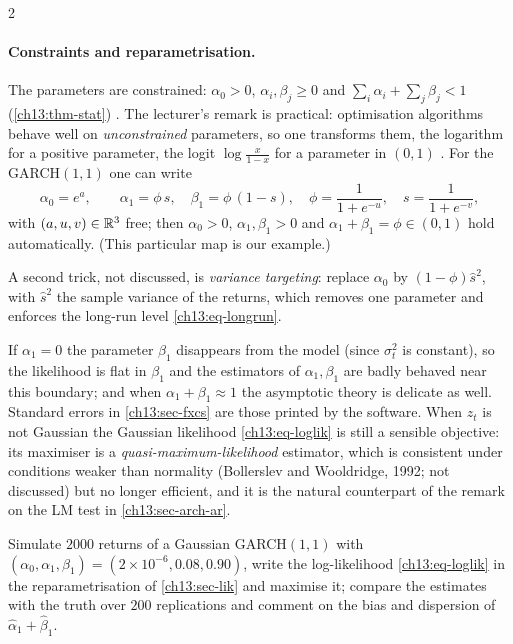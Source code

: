 \begin{paracol}{2}
\paragraph{Constraints and reparametrisation.} The parameters are constrained: $\alpha_0>0$, $\alpha_i,\beta_j\ge0$ and $\sum_i\alpha_i+\sum_j\beta_j<1$ (\cref{ch13:thm-stat}) . The lecturer's
remark is practical: optimisation algorithms behave well on \emph{unconstrained} parameters, so one transforms them, the logarithm for a positive parameter, the logit
$\log\frac x{1-x}$ for a parameter in $(0,1)$ . For the GARCH$(1,1)$ one can write
\[
  \alpha_0=e^{a},\qquad \alpha_1=\phi\,s,\quad\beta_1=\phi\,(1-s),\quad \phi=\frac1{1+e^{-u}},\quad s=\frac1{1+e^{-v}},
\]
with $(a,u,v)\in\mathbb{R}^3$ free; then $\alpha_0>0$, $\alpha_1,\beta_1>0$ and $\alpha_1+\beta_1=\phi\in(0,1)$ hold automatically. (This particular map is our example.)
\begin{secondary}
A second trick, not discussed, is \emph{variance targeting}:
replace $\alpha_0$ by $(1-\phi)\hat s^2$, with $\hat s^2$ the sample variance of the returns, which removes one parameter and enforces the long-run level \eqref{ch13:eq-longrun}.
\end{secondary}

\begin{remark}\label{ch13:rem-ident}
If $\alpha_1=0$ the parameter $\beta_1$ disappears from the model (since $\sigma_t^2$ is constant), so the likelihood is flat in $\beta_1$ and the estimators of $\alpha_1,\beta_1$ are badly behaved near this boundary; and when $\alpha_1+\beta_1\approx1$ the
asymptotic theory is delicate as well. Standard errors in \cref{ch13:sec-fxcs} are those printed by the software. When $z_t$ is not Gaussian the Gaussian likelihood \eqref{ch13:eq-loglik} is still a sensible objective: its maximiser is a
\emph{quasi-maximum-likelihood} estimator, which is consistent under conditions weaker than normality (Bollerslev and Wooldridge, 1992; not discussed) but no longer efficient, and it is the natural counterpart of
the remark on the LM test in \cref{ch13:sec-arch-ar}.
\end{remark}

\begin{exercise}\label{ch13:ex-extra4}
Simulate $2000$ returns of a Gaussian GARCH$(1,1)$ with $(\alpha_0,\alpha_1,\beta_1)=(2\times10^{-6},0.08,0.90)$, write the log-likelihood \eqref{ch13:eq-loglik} in the reparametrisation of \cref{ch13:sec-lik} and maximise it; compare the estimates with the truth over $200$ replications and comment on the bias and dispersion of $\hat\alpha_1+\hat\beta_1$.
\end{exercise}


\end{paracol}
